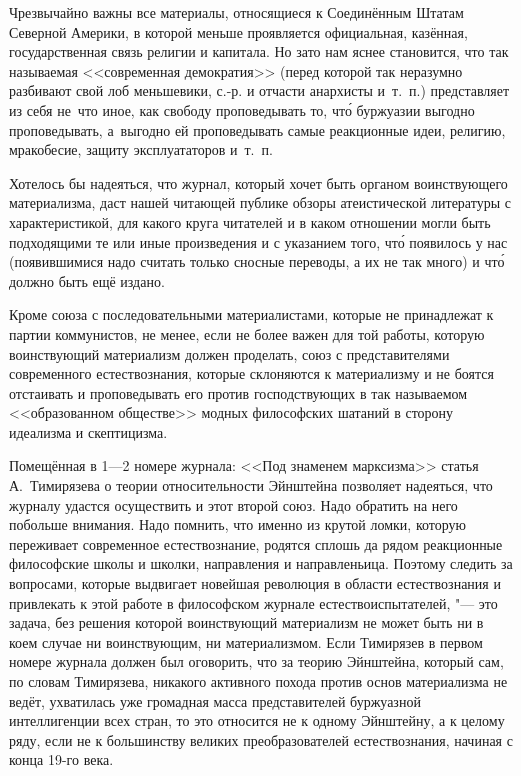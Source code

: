 Чрезвычайно важны все материалы, относящиеся к Соединённым Штатам Северной
Америки, в которой меньше проявляется официальная, казённая,
государственная связь религии и капитала. Но зато нам яснее становится, что
так называемая <<современная демократия>> (перед которой так неразумно
разбивают свой лоб меньшевики, с.-р. и отчасти анархисты и~т.~п.)
представляет из себя не~что иное, как свободу проповедывать то, чт\'{о}
буржуазии выгодно проповедывать, а~выгодно ей проповедывать самые
реакционные идеи, религию, мракобесие, защиту эксплуататоров и~т.~п.

Хотелось бы надеяться, что журнал, который хочет быть органом воинствующего
материализма, даст нашей читающей публике обзоры атеистической литературы с
характеристикой, для какого круга читателей и в каком отношении могли быть
подходящими те или иные произведения и с указанием того, чт\'{о} появилось у
нас (появившимися надо считать только сносные переводы, а их не так много)
и чт\'{о} должно быть ещё издано.

Кроме союза с последовательными материалистами, которые не принадлежат к
партии коммунистов, не менее, если не более важен для той работы, которую
воинствующий материализм должен проделать, союз с представителями
современного естествознания, которые склоняются к материализму и не боятся
отстаивать и проповедывать его против господствующих в так называемом
<<образованном обществе>> модных философских шатаний в сторону идеализма и
скептицизма.

Помещённая в 1---2 номере журнала: <<Под знаменем марксизма>> статья
А.~Тимирязева о теории относительности Эйнштейна
позволяет надеяться, что журналу удастся осуществить и этот второй союз.
Надо обратить на него побольше внимания. Надо помнить, что именно из крутой
ломки, которую переживает современное естествознание, родятся сплошь да
рядом реакционные философские школы и школки, направления и направленьица.
Поэтому следить за вопросами, которые выдвигает новейшая революция в
области естествознания и привлекать к этой работе в философском журнале
естествоиспытателей, "--- это задача, без решения которой воинствующий
материализм не может быть ни в коем случае ни воинствующим, ни
материализмом. Если Тимирязев в первом номере журнала должен был оговорить,
что за теорию Эйнштейна, который сам, по словам Тимирязева, никакого
активного похода против основ материализма не ведёт, ухватилась уже
громадная масса представителей буржуазной интеллигенции всех стран, то это
относится не к одному Эйнштейну, а к целому ряду, если не к большинству
великих преобразователей естествознания, начиная с конца 19-го века.

